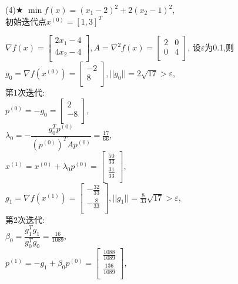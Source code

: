 \begin{problem}{(4)$\bigstar$}
    $\min f(x)=(x_1-2)^2+2(x_2-1)^2$,\\
    初始迭代点${x^{(0)}}=[1,3]^T$
\end{problem}
\begin{solution}
    $\nabla f(x)=\begin{bmatrix}
        2x_1-4  \\
        4x_2-4  \\
    \end{bmatrix}, A=\nabla^2 f(x)=\begin{bmatrix}
        2  & 0  \\
        0  & 4  \\
    \end{bmatrix}$,
    设$\varepsilon$为0.1,则\\
    $g_0=\nabla f(x^{(0)})=\begin{bmatrix} -2\\8\\\end{bmatrix},||g_0||=2\sqrt{17}>\varepsilon$,\\
    第1次迭代:\\
    $p^{(0)}=-g_0=\begin{bmatrix} 2\\-8\\\end{bmatrix}$,\\
    $\lambda_0=-\dfrac{g_0^Tp^{(0)}}{(p^{(0)})^TAp^{(0)}}=\frac{17}{66}$,\\
    $x^{(1)}=x^{(0)}+\lambda_0p^{(0)}=\begin{bmatrix} \frac{50}{33}\\\frac{31}{33}\\\end{bmatrix}$,\\
    $g_1=\nabla f(x^{(1)})=\begin{bmatrix} -\frac{32}{33}\\-\frac{8}{33}\\\end{bmatrix},||g_1||=\frac{8}{33}\sqrt{17}>\varepsilon$,\\
    第2次迭代:\\
    $\beta_0=\dfrac{g_1^Tg_1}{g_0^Tg_0}=\frac{16}{1089}$,\\
    $p^{(1)}=-g_1+\beta_0p^{(0)}=\begin{bmatrix} \frac{1088}{1089}\\\frac{136}{1089}\\\end{bmatrix}$,\\

\end{solution}
